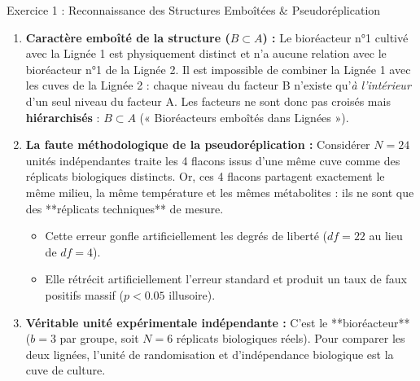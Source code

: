 \documentclass[11pt,a4paper]{article}
\begin{document}

\begin{solutionbox}{Exercice 1 : Reconnaissance des Structures Emboîtées \& Pseudoréplication}
\begin{enumerate}[label=\textbf{\alph*.}]
  \item \textbf{Caractère emboîté de la structure ($B \subset A$) :}
  Le bioréacteur n°1 cultivé avec la Lignée 1 est physiquement distinct et n'a aucune relation avec le bioréacteur n°1 de la Lignée 2. Il est impossible de combiner la Lignée 1 avec les cuves de la Lignée 2 : chaque niveau du facteur B n'existe qu'\textit{à l'intérieur} d'un seul niveau du facteur A. Les facteurs ne sont donc pas croisés mais \textbf{hiérarchisés} : $B \subset A$ (« Bioréacteurs emboîtés dans Lignées »).

  \item \textbf{La faute méthodologique de la pseudoréplication :}
  Considérer $N = 24$ unités indépendantes traite les 4 flacons issus d'une même cuve comme des réplicats biologiques distincts. Or, ces 4 flacons partagent exactement le même milieu, la même température et les mêmes métabolites : ils ne sont que des **réplicats techniques** de mesure.
  \begin{itemize}
    \item Cette erreur gonfle artificiellement les degrés de liberté ($df = 22$ au lieu de $df = 4$).
    \item Elle rétrécit artificiellement l'erreur standard et produit un taux de faux positifs massif ($p < 0.05$ illusoire).
  \end{itemize}

  \item \textbf{Véritable unité expérimentale indépendante :}
  C'est le **bioréacteur** ($b = 3$ par groupe, soit $N = 6$ réplicats biologiques réels). Pour comparer les deux lignées, l'unité de randomisation et d'indépendance biologique est la cuve de culture.
\end{enumerate}
\end{solutionbox}
\end{document}
